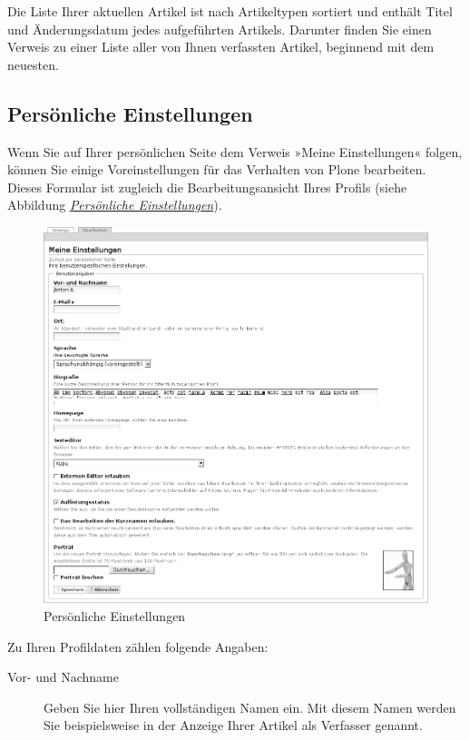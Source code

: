 \documentclass[a4paper,12pt,ngerman]{manual}
\begin{document}
Die Liste Ihrer aktuellen Artikel ist nach Artikeltypen sortiert und
enthält Titel und Änderungsdatum jedes aufgeführten Artikels. Darunter
finden Sie einen Verweis zu einer Liste aller von Ihnen verfassten
Artikel, beginnend mit dem neuesten.
\hypertarget{sec-persoenliche-einstellungen}{}

\subsection{Persönliche Einstellungen}

Wenn Sie auf Ihrer persönlichen Seite dem Verweis »Meine Einstellungen«
folgen, können Sie einige Voreinstellungen für das Verhalten von Plone
bearbeiten. Dieses Formular ist zugleich die Bearbeitungsansicht Ihres Profils
(siehe Abbildung \hyperlink{fig-meine-einstellungen}{\emph{Persönliche Einstellungen}}).
\hypertarget{fig-meine-einstellungen}{}\begin{figure}[htbp]
\centering

\includegraphics{meine-einstellungen.png}
\caption{Persönliche Einstellungen}\end{figure}

Zu Ihren Profildaten zählen folgende Angaben:
\begin{description}
\item[Vor- und Nachname] \leavevmode
Geben Sie hier Ihren vollständigen Namen ein. Mit
diesem Namen werden Sie beispielsweise in der Anzeige Ihrer Artikel als
Verfasser genannt.

\end{description}
\end{document}

